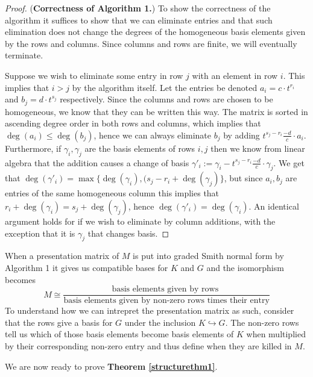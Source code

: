 \begin{proof}(\textbf{Correctness of Algorithm 1.})
  To show the correctness of the algorithm it suffices to show that we can eliminate entries and that such elimination does not change the degrees of the homogeneous basis elements given by the rows and columns. Since columns and rows are finite, we will eventually terminate.

  Suppose we wish to eliminate some entry in row $j$ with an element in row $i$. This implies that $ i > j$ by the algorithm itself. Let the entries be denoted $a_{i}= c \cdot t^{r_{i}}$ and $b_{j} = d \cdot t^{s_{j}}$ respectively. Since the columns and rows are chosen to be homogeneous, we know that they can be written this way. The matrix is sorted in ascending degree order in both rows and columns, which implies that $\deg(a_{i}) \leq \deg(b_{j})$, hence we can always eliminate $b_{j}$ by adding $t^{s_{j}-r_{i}} \frac{-d}{c} \cdot a_{i}$. Furthermore, if $\gamma_{i},\gamma_{j}$ are the basis elements of rows $i,j$ then we know from linear algebra that the addition causes a change of basis $\gamma'_{i}:=\gamma_{i}-t^{s_{j}-r_{i}} \frac{-d}{c} \cdot \gamma_{j}$. We get that $\deg(\gamma'_{i})=\max\{\deg(\gamma_{i}), (s_{j}-r_{i}+\deg(\gamma_{j})\}$, but since $a_{i},b_{j}$ are entries of the same homogeneous column this implies that $r_{i} + \deg(\gamma_{i}) = s_{j} + \deg(\gamma_{j})$, hence $\deg(\gamma'_{i}) = \deg(\gamma_{i})$. An identical argument holds for if we wish to eliminate by column additions, with the exception that it is $\gamma_{j}$ that changes basis.
\end{proof}
When a presentation matrix of $M$ is put into graded Smith normal form by Algorithm 1 it gives us compatible bases for $K$ and $G$ and the isomorphism becomes \[M\cong \frac{\text{basis  elements given by rows  }}{\text{basis elements given by non-zero rows times their entry}}\]
To understand how we can intrepret the presentation matrix as such, consider that the rows give a basis for $G$ under the inclusion $K \hookrightarrow G$. The non-zero rows tell us which of those basis elements become basis elements of $K$ when multiplied by their corresponding non-zero entry and thus define when they are killed in $M$.

We are now ready to prove \textbf{Theorem \ref{structurethm1}}.

